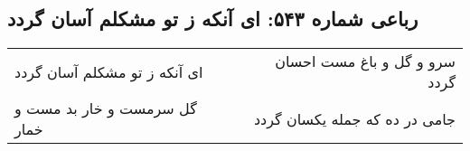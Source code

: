 \begin{center}
\section*{رباعی شماره ۵۴۳: ای آنکه ز تو مشکلم آسان گردد}
\label{sec:0543}
\begin{longtable}{l p{0.5cm} r}
ای آنکه ز تو مشکلم آسان گردد
&&
سرو و گل و باغ مست احسان گردد
\\
گل سرمست و خار بد مست و خمار
&&
جامی در ده که جمله یکسان گردد
\\
\end{longtable}
\end{center}
